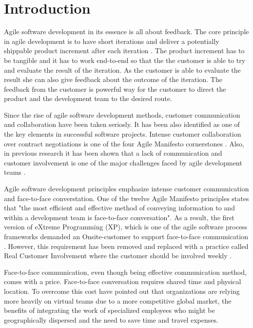 \documentclass[english,12pt,a4paper,pdftex]{article}
\begin{document}
\section{Introduction}

Agile software development in its essence is all about feedback. The core principle in agile development is to have short iterations and deliver a potentially shippable product increment after each iteration \citep{schwaber2009agile}. The product increment has to be tangible and it has to work end-to-end so that the the customer is able to try and evaluate the result of the iteration. As the customer is able to evaluate the result she can also give feedback about the outcome of the iteration. The feedback from the customer is powerful way for the customer to direct the product and the development team to the desired route.

Since the rise of agile software development methods, customer communication and collaboration have been taken seriosly. It has been also identified as one of the key elements in successful software projects. Intense customer collaboration over contract negotiations is one of the four Agile Manifesto cornerstones \citep{agilemanifesto}. Also, in previous research it has been shown that a lack of communication and customer involvement is one of the major challenges faced by agile development teams \citep{korkala2006}.

Agile software development principles emphasize intense customer communication and face-to-face converstation. One of the twelve Agile Manifesto principles states that "the most efficient and effective method of conveying information to and within a development team is face-to-face conversation". \citep{agilemanifesto} As a result, the first version of eXtreme Programming (XP), which is one of the agile software process frameworks demanded an Onsite-customer to support face-to-face communication \citep{beck2004}. However, this requirement has been removed and replaced with a practice called Real Customer Involvement where the customer should be involved weekly \citep{korkala2006}.

Face-to-face communication, even though being effective communication method, comes with a price. Face-to-face conversation requires shared time and physical location. To overcome this cost \citet{derosa2004} have pointed out that organizations are relying more heavily on virtual teams due to a more competitive global market, the benefits of integrating the work of specialized employees who might be geographically dispersed and the need to save time and travel expenses. 
\end{document}
